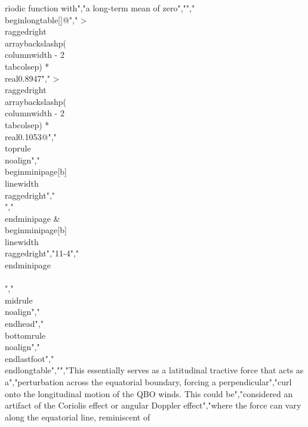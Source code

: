 {{{{{{{riodic function with","a long-term mean of zero","","\\begin{longtable}[]{@{}","  >{\\raggedright\\arraybackslash}p{(\\columnwidth - 2\\tabcolsep) * \\real{0.8947}}","  >{\\raggedright\\arraybackslash}p{(\\columnwidth - 2\\tabcolsep) * \\real{0.1053}}@{}}","\\toprule\\noalign{}","\\begin{minipage}[b]{\\linewidth}\\raggedright","\\[\\begin{array}{r}","\\frac{\\partial\\varphi}{\\partial t} = \\sum_{i = 1}^{i = N}{k_{i}\\omega_{i}\\cos(\\omega_{i}t)}","\\end{array}\\]","\\end{minipage} & \\begin{minipage}[b]{\\linewidth}\\raggedright","11-4","\\end{minipage} \\\\","\\midrule\\noalign{}","\\endhead","\\bottomrule\\noalign{}","\\endlastfoot","\\end{longtable}","","This essentially serves as a latitudinal tractive force that acts as a","perturbation across the equatorial boundary, forcing a perpendicular","curl onto the longitudinal motion of the QBO winds. This could be","considered an artifact of the Coriolis effect or angular Doppler effect","where the force can vary along the equatorial line, reminiscent of }}}}}}}
